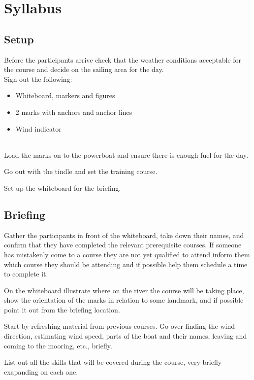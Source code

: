 \documentclass[12pt]{scrartcl}
\begin{document}
\newpage

\section{Syllabus} \label{sec:syllabus}

\subsection{Setup} \label{subsec:setup}

Before the participants arrive check that the weather conditions acceptable for the course and decide on the sailing area for the day.
\\
Sign out the following:

\label{list:materials}
\begin{itemize}
	\item Whiteboard, markers and figures
	\item 2 marks with anchors and anchor lines
	\item Wind indicator
\end{itemize}
\\
Load the marks on to the powerboat and ensure there is enough fuel for the day.

Go out with the tindle and set the training course.

Set up the whiteboard for the briefing.

\subsection{Briefing} \label{subsec:briefing}

Gather the participants in front of the whiteboard, take down their names, and confirm that they have completed the relevant prerequisite courses. If someone has mistakenly come to a course they are not yet qualified to attend inform them which course they should be attending and if possible help them schedule a time to complete it.

On the whiteboard illustrate where on the river the course will be taking place, show the orientation of the marks in relation to some landmark, and if possible point it out from the briefing location.

Start by refreshing material from previous courses. Go over finding the wind direction, estimating wind speed, parts of the boat and their names, leaving and coming to the mooring, etc., briefly.

List out all the skills that will be covered during the course, very briefly exapanding on each one.
\end{document}
